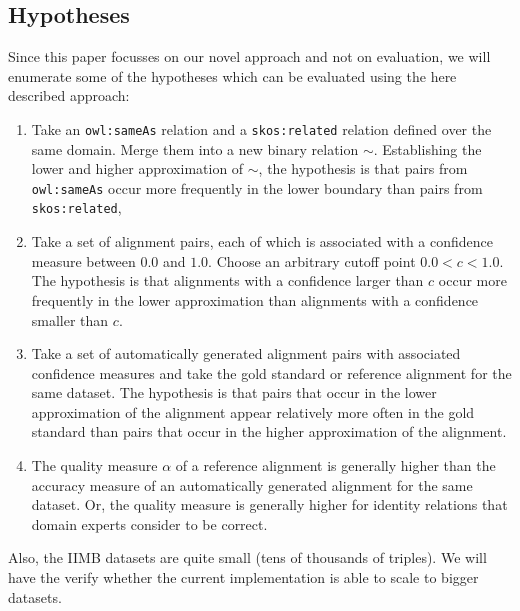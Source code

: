\subsection{Hypotheses}
\label{sec:hypotheses}

Since this paper focusses on our novel approach and not on evaluation,
  we will enumerate some of the hypotheses which can be evaluated
  using the here described approach:
\begin{enumerate}
\item Take an {\small \texttt{owl:sameAs}} relation and
        a {\small \texttt{skos:related}}
        relation defined over the same domain.
      Merge them into a new binary relation $\sim$.
      Establishing the lower and higher approximation of $\sim$,
        the hypothesis is that pairs from {\small \texttt{owl:sameAs}}
        occur more frequently in the lower boundary than pairs from
        {\small \texttt{skos:related}},
\item Take a set of alignment pairs, each of which is associated with
        a confidence measure between $0.0$ and $1.0$.
      Choose an arbitrary cutoff point $0.0 < c < 1.0$.
      The hypothesis is that alignments with a confidence larger than $c$
        occur more frequently in the lower approximation than alignments
        with a confidence smaller than $c$.
\item Take a set of automatically generated alignment pairs with
        associated confidence measures and take the gold standard or
        reference alignment for the same dataset.
      The hypothesis is that pairs that occur in the lower approximation
        of the alignment appear relatively more often in the gold standard
        than pairs that occur in the higher approximation of the alignment.
\item The quality measure $\alpha$ of a reference alignment is generally
        higher than the accuracy measure of an automatically generated
        alignment for the same dataset.
      Or, the quality measure is generally higher for identity relations
        that domain experts consider to be correct.
\end{enumerate}

Also, the IIMB datasets are quite small (tens of thousands of triples).
We will have the verify whether the current implementation is able to scale
  to bigger datasets.
